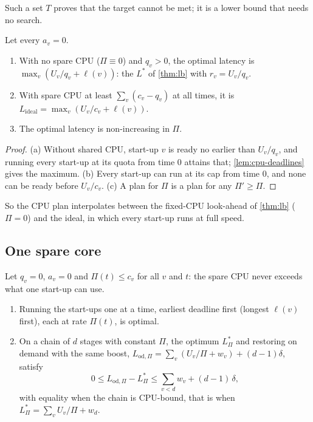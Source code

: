 Such a set $T$ proves that the target cannot be met; it is a lower bound that needs no search.

\begin{proposition}
\label{prop:cpu-limits}
Let every $a_v = 0$.
\begin{enumerate}[label=(\alph*)]
  \item With no spare CPU ($\Pi \equiv 0$) and $q_v > 0$, the optimal latency is
        $\max_v (U_v / q_v + \ell(v))$: the $L^*$ of \cref{thm:lb} with $r_v = U_v / q_v$.
  \item With spare CPU at least $\sum_v (c_v - q_v)$ at all times, it is
        $L_{\mathrm{ideal}} = \max_v (U_v / c_v + \ell(v))$.
  \item The optimal latency is non-increasing in $\Pi$.
\end{enumerate}
\end{proposition}

\begin{proof}
(a) Without shared CPU, start-up $v$ is ready no earlier than $U_v / q_v$, and running every
start-up at its quota from time $0$ attains that; \cref{lem:cpu-deadlines} gives the maximum.
(b) Every start-up can run at its cap from time $0$, and none can be ready before $U_v / c_v$.
(c) A plan for $\Pi$ is a plan for any $\Pi' \ge \Pi$.
\end{proof}

So the CPU plan interpolates between the fixed-CPU look-ahead of \cref{thm:lb} ($\Pi = 0$) and the
ideal, in which every start-up runs at full speed.

\subsection{One spare core}

\begin{proposition}
\label{prop:cpu-onecore}
Let $q_v = 0$, $a_v = 0$ and $\Pi(t) \le c_v$ for all $v$ and $t$: the spare CPU never exceeds what
one start-up can use.
\begin{enumerate}[label=(\alph*)]
  \item Running the start-ups one at a time, earliest deadline first (longest $\ell(v)$ first),
        each at rate $\Pi(t)$, is optimal.
  \item On a chain of $d$ stages with constant $\Pi$, the optimum $L^*_\Pi$ and restoring on demand
        with the same boost, $L_{\mathrm{od},\Pi} = \sum_v (U_v / \Pi + w_v) + (d - 1)\delta$,
        satisfy
        \[
          0 \le L_{\mathrm{od},\Pi} - L^*_\Pi \le \sum_{v < d} w_v + (d - 1)\,\delta ,
        \]
        with equality when the chain is CPU-bound, that is when
        $L^*_\Pi = \sum_v U_v / \Pi + w_d$.
\end{enumerate}
\end{proposition}

